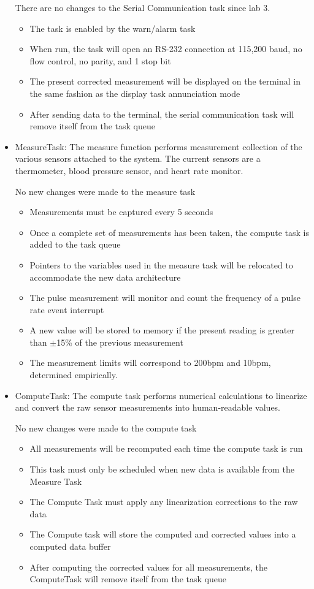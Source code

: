 \documentclass[12pt]{article} %
\begin{document}
\begin{itemize}
		There are no changes to the Serial Communication task since lab 3.
    \begin{itemize}
      \item The task is enabled by the warn/alarm task
      \item When run, the task will open an RS-232 connection at 115,200 baud,
          no flow control, no parity, and 1 stop bit
      \item The present corrected measurement will be displayed on the terminal
	in the same fashion as the display task annunciation mode
      \item After sending data to the terminal, the serial communication task
	will remove itself from the task queue
    \end{itemize}

  \item MeasureTask:
		The measure function performs measurement collection of the various sensors
		attached to the system. The current sensors are a thermometer, blood
		pressure sensor, and heart rate monitor.
		
		No new changes were made to the measure task
    \begin{itemize}
			\item Measurements must be captured every 5 seconds
      \item Once a complete set of measurements has been taken, the compute
	task is added to the task queue
      \item Pointers to the variables used in the measure task will be
	relocated to accommodate the new data architecture
      \item The pulse measurement will monitor and count the frequency of a
	pulse rate event interrupt
      \item A new value will be stored to memory if the present reading is
	greater than $\pm$15\% of the previous measurement
      \item The measurement limits will correspond to 200bpm and 10bpm,
	determined empirically. 
    \end{itemize}

  \item ComputeTask:
		The compute task performs numerical calculations to linearize and convert the raw sensor measurements into human-readable values.
		
		No new changes were made to the compute task
    \begin{itemize}
      \item All measurements will be recomputed each time the compute task is run
			\item This task must only be scheduled when new data is available from the Measure Task
			\item The Compute Task must apply any linearization corrections to the raw data
			\item The Compute task will store the computed and corrected values into a computed data buffer
      \item After computing the corrected values for all measurements, the
	ComputeTask will remove itself from the task queue
    \end{itemize}


\end{itemize}
\end{document}
